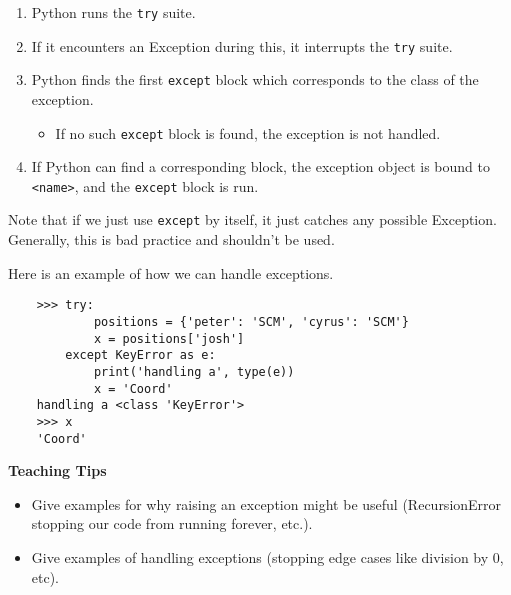 \begin{enumerate}
    \item Python runs the \lstinline{try} suite.
    \item If it encounters an Exception during this, it interrupts the \lstinline{try} suite.
    \item Python finds the first \lstinline{except} block which corresponds to the class of the exception.
        \begin{itemize}
            \item If no such \lstinline{except} block is found, the exception is not handled.
        \end{itemize}
    \item If Python can find a corresponding block, the exception object is bound to \lstinline{<name>}, and the \lstinline{except} block is run.
\end{enumerate}

Note that if we just use \lstinline{except} by itself, it just catches any possible Exception. Generally, this is bad practice and shouldn't be used.

Here is an example of how we can handle exceptions.
\begin{lstlisting}
    >>> try:
            positions = {'peter': 'SCM', 'cyrus': 'SCM'}
            x = positions['josh']
        except KeyError as e:
            print('handling a', type(e))
            x = 'Coord'
    handling a <class 'KeyError'>
    >>> x
    'Coord'
\end{lstlisting}

\begin{blocksection}
\begin{guide}
\textbf{Teaching Tips}
\begin{itemize}
    \item Give examples for why raising an exception might be useful (RecursionError stopping our code from running forever, etc.).
    \item Give examples of handling exceptions (stopping edge cases like division by 0, etc).
\end{itemize}
\end{guide}
\end{blocksection}